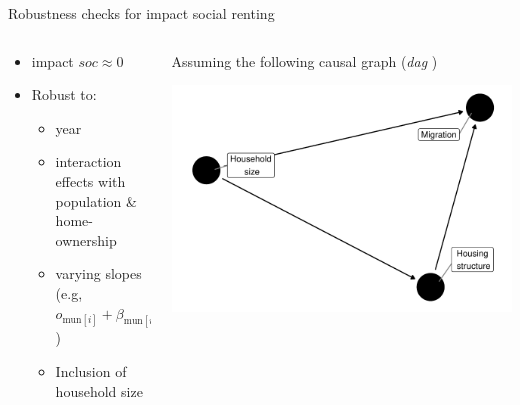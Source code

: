 \documentclass{beamer}
\begin{document}
\begin{frame}{Robustness checks for impact social renting}
			\begin{columns}
		\begin{column}{0.5\textwidth}
			\begin{itemize}
				\item  \alert{impact} $soc \approx 0$ \newline \pause
				\item Robust to:
				\begin{itemize}
					\item year
					\item interaction effects with population \& home-ownership
					\item varying slopes (e.g, $o_{\text{mun}[i]} + \beta_{\text{mun}[i]} \log(\text{soc}_i)$) 
					\item Inclusion of household size\pause
				\end{itemize}
			\end{itemize}
		\end{column}
		\begin{column}{0.5\textwidth} 
			\alert{Assuming} the following causal graph (\emph{dag} )
			\begin{center}
				\includegraphics[width=\textwidth]{../fig/dag}      
			\end{center}
		\end{column}
	\end{columns}
\end{frame}
\end{document}
